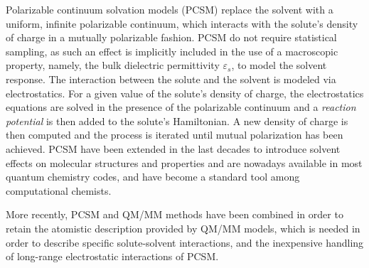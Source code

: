 Polarizable continuum solvation models\cite{MST,ReviewPCM_1994,ReviewPCM_2005,Orozco_CR_Solvent00,Klamt:2011we,Mennucci:2012ct,honig1995cla,Roux:1999vp} (PCSM) replace the solvent with a uniform, infinite polarizable continuum, which interacts with the solute's density of charge in a mutually polarizable fashion. PCSM do not require statistical sampling, as such an effect is implicitly included in the use of a macroscopic property, namely, the bulk dielectric permittivity $\varepsilon_s$, to model the solvent response. The interaction between the solute and the solvent is modeled via electrostatics. For a given value of the solute's density of charge, the electrostatics equations are solved in the presence of the polarizable continuum and a \emph{reaction potential} is then added to the solute's Hamiltonian. A new density of charge is then computed and the process is iterated until mutual polarization has been achieved\cite{ReviewPCM_2005,Lipparini_JCP_VPCM,Lipparini_JCTC_VPCMSCF,Lipparini_JCP_Perspective}.
PCSM have been extended in the last decades to introduce solvent effects on molecular structures and properties\cite{Tomasi_PCCP_PCMProps,Mennucci_Chir_PCMProps,Mennucci_JPCL_PCM} and are nowadays available in most quantum chemistry codes, and have become a standard tool among computational chemists. 

More recently, PCSM and QM/MM methods have been combined\cite{Pedone_CPC_QMMMPCM,Rega_JACS_QMMMPCM,Vreven_JCP_OniomPCM,Bandyopadhyay2002,Lipparini_JCTC_FQPCM,Caprasecca_JCTC_FMM,Steindal_JCPA_QMMMPCM,Boulanger_JCTC_QMMMPolPCM,Caprasecca_JCTC_QMMMPolPCM} in order to retain the atomistic description provided by QM/MM models, which is needed in order to describe specific solute-solvent interactions, and the inexpensive handling of long-range electrostatic interactions of PCSM.

